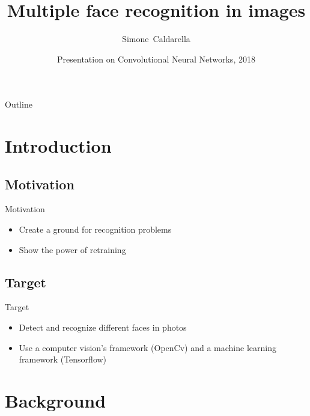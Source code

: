 \documentclass{beamer}
\title[Face recognition]
{Multiple face recognition in images}
\author[Simone Caldarella]
{Simone~Caldarella }
\institute[University of Brescia] 
{
  	IEEE Student Branch Brescia\\
  	University of Brescia
}
\date[IEEE Student Branch 2018] 
{
	Presentation on Convolutional Neural Networks, 2018
}
\begin{document}
\begin{frame}
 	\titlepage
\end{frame}

\begin{frame}{Outline}
	\begin{multicols}{2}
  		\tableofcontents
	\end{multicols}
\end{frame}


\section{Introduction}

\subsection{Motivation}

\begin{frame}{Motivation}
	\begin{itemize}
		[triangle]
		\item
    			Create a ground for recognition problems
		\item
			Show the power of retraining
	\end{itemize}
\end{frame}


\subsection{Target}
\begin{frame}{Target}
	\begin{itemize}
	[triangle]
		\item
    			Detect and recognize different faces in photos
		\item
			Use a computer vision's framework (OpenCv) and a machine learning framework (Tensorflow)
	\end{itemize}
\end{frame}


\section{Background}
\end{document}
